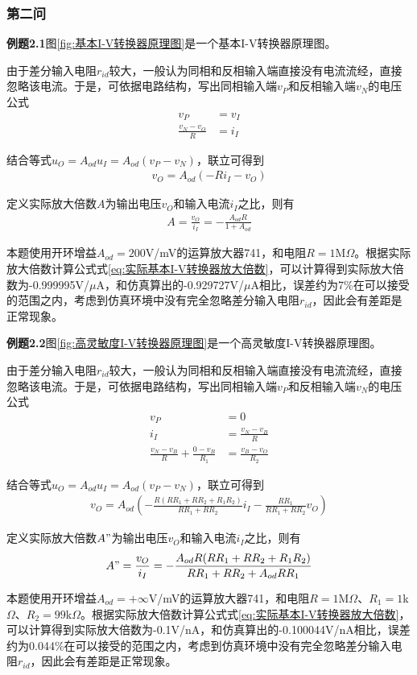 \documentclass[./测控三级项目.tex]{subfiles} %
\begin{document}
		\subsubsection{第二问}
			\textbf{例题2.1}\qquad 图\ref{fig:基本I-V转换器原理图}是一个基本I-V转换器原理图。\par
			由于差分输入电阻$r_{id}$较大，一般认为同相和反相输入端直接没有电流流经，直接忽略该电流。于是，可依据电路结构，写出同相输入端$v_P$和反相输入端$v_N$的电压公式
			\begin{align}
				v_P&=v_I \\
				\frac{v_N-v_O}{R}&=i_I
			\end{align}\par
			结合等式$u_O=A_{od}u_I=A_{od}(v_P-v_N)$，联立可得到
			\begin{align}
				v_O=A_{od}(-Ri_I-v_O)
			\end{align}\par
			定义实际放大倍数$A$为输出电压$v_O$和输入电流$i_I$之比，则有
			\begin{align}\label{eq:实际基本I-V转换器放大倍数}
				A=\frac{v_O}{i_I}=-\frac{A_{od}R}{1+A_{od}}
			\end{align}\par
			本题使用开环增益$A_{od}=200$V/mV的运算放大器741，和电阻$R=1$M$\Omega$。根据实际放大倍数计算公式式\ref{eq:实际基本I-V转换器放大倍数}，可以计算得到实际放大倍数为-0.999995V/$\mu$A，和仿真算出的-0.929727V/$\mu$A相比，误差约为7\%在可以接受的范围之内，考虑到仿真环境中没有完全忽略差分输入电阻$r_{id}$，因此会有差距是正常现象。\par
			\textbf{例题2.2}\qquad 图\ref{fig:高灵敏度I-V转换器原理图}是一个高灵敏度I-V转换器原理图。\par
			由于差分输入电阻$r_{id}$较大，一般认为同相和反相输入端直接没有电流流经，直接忽略该电流。于是，可依据电路结构，写出同相输入端$v_P$和反相输入端$v_N$的电压公式
			\begin{align}
				v_P&=0 \\
				i_I&=\frac{v_N-v_B}{R}\\
				\frac{v_N-v_B}{R}+\frac{0-v_B}{R_1}&=\frac{v_B-v_O}{R_2}
			\end{align}\par
			结合等式$u_O=A_{od}u_I=A_{od}(v_P-v_N)$，联立可得到
			\begin{align}
				v_O=A_{od}(-\frac{R(RR_1+RR_2+R_1R_2)}{RR_1+RR_2}i_I-\frac{RR_1}{RR_1+RR_2}v_O)
			\end{align}\par
			定义实际放大倍数$A"$为输出电压$v_O$和输入电流$i_I$之比，则有
			\begin{align}\label{eq:实际高灵敏度I-V转换器放大倍数}
				A"=\frac{v_O}{i_I}=-\frac{A_{od}R(RR_1+RR_2+R_1R_2)}{RR_1+RR_2+A_{od}RR_1}
			\end{align}\par
			本题使用开环增益$A_{od}=+\infty$V/mV的运算放大器741，和电阻$R=1$M$\Omega$、$R_1=1$k$\Omega$、$R_2=99$k$\Omega$。根据实际放大倍数计算公式式\ref{eq:实际基本I-V转换器放大倍数}，可以计算得到实际放大倍数为-0.1V/nA，和仿真算出的-0.100044V/nA相比，误差约为0.044\%在可以接受的范围之内，考虑到仿真环境中没有完全忽略差分输入电阻$r_{id}$，因此会有差距是正常现象。\par
			
\end{document}
